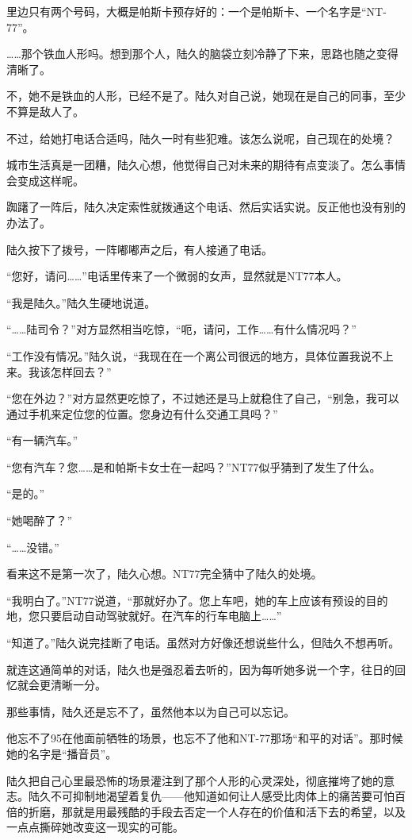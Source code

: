 里边只有两个号码，大概是帕斯卡预存好的：一个是帕斯卡、一个名字是“NT-77”。

……那个铁血人形吗。想到那个人，陆久的脑袋立刻冷静了下来，思路也随之变得清晰了。

不，她不是铁血的人形，已经不是了。陆久对自己说，她现在是自己的同事，至少不算是敌人了。

不过，给她打电话合适吗，陆久一时有些犯难。该怎么说呢，自己现在的处境？

城市生活真是一团糟，陆久心想，他觉得自己对未来的期待有点变淡了。怎么事情会变成这样呢。

踟躇了一阵后，陆久决定索性就拨通这个电话、然后实话实说。反正他也没有别的办法了。

陆久按下了拨号，一阵嘟嘟声之后，有人接通了电话。

“您好，请问……”电话里传来了一个微弱的女声，显然就是NT77本人。

“我是陆久。”陆久生硬地说道。

“……陆司令？”对方显然相当吃惊，“呃，请问，工作……有什么情况吗？”

“工作没有情况。”陆久说，“我现在在一个离公司很远的地方，具体位置我说不上来。我该怎样回去？”

“您在外边？”对方显然更吃惊了，不过她还是马上就稳住了自己，“别急，我可以通过手机来定位您的位置。您身边有什么交通工具吗？”

“有一辆汽车。”

“您有汽车？您……是和帕斯卡女士在一起吗？”NT77似乎猜到了发生了什么。

“是的。”

“她喝醉了？”

“……没错。”

看来这不是第一次了，陆久心想。NT77完全猜中了陆久的处境。

“我明白了。”NT77说道，“那就好办了。您上车吧，她的车上应该有预设的目的地，您只要启动自动驾驶就好。在汽车的行车电脑上……”

“知道了。”陆久说完挂断了电话。虽然对方好像还想说些什么，但陆久不想再听。

就连这通简单的对话，陆久也是强忍着去听的，因为每听她多说一个字，往日的回忆就会更清晰一分。

那些事情，陆久还是忘不了，虽然他本以为自己可以忘记。

他忘不了95在他面前牺牲的场景，也忘不了他和NT-77那场“和平的对话”。那时候她的名字是“播音员”。

陆久把自己心里最恐怖的场景灌注到了那个人形的心灵深处，彻底摧垮了她的意志。陆久不可抑制地渴望着复仇——他知道如何让人感受比肉体上的痛苦要可怕百倍的折磨，那就是用最残酷的手段去否定一个人存在的价值和活下去的希望，以及一点点撕碎她改变这一现实的可能。

